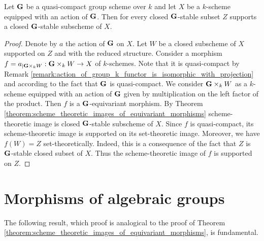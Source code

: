 \begin{corollary}\label{corollary:every_closed_stable_subset_supports_closed_stable_subscheme}
Let $\mathbf{G}$ be a quasi-compact group scheme over $k$ and let $X$ be a $k$-scheme equipped with an action of $\mathbf{G}$. Then for every closed $\mathbf{G}$-stable subset $Z$ supports a closed $\mathbf{G}$-stable subscheme of $X$.
\end{corollary}
\begin{proof}
Denote by $a$ the action of $\mathbf{G}$ on $X$. Let $W$ be a closed subscheme of $X$ supported on $Z$ and with the reduced structure. Consider a morphism $f = a_{\mid \mathbf{G}\times_k W}:\mathbf{G}\times_k W\rightarrow X$ of $k$-schemes. Note that it is quasi-compact by Remark \ref{remark:action_of_group_k_functor_is_isomorphic_with_projection} and according to the fact that $\mathbf{G}$ is quasi-compact. We consider $\mathbf{G}\times_k W$ as a $k$-scheme equipped with an action of $\mathbf{G}$ given by multiplication on the left factor of the product. Then $f$ is a $\mathbf{G}$-equivariant morphism. By Theorem \ref{theorem:scheme_theoretic_images_of_equivariant_morphisms} scheme-theoretic image is closed $\mathbf{G}$-stable subscheme of $X$. Since $f$ is quasi-compact, its scheme-theoretic image is supported on its set-theoretic image. Moreover, we have $f(W) = Z$ set-theoretically. Indeed, this is a consequence of the fact that $Z$ is $\mathbf{G}$-stable closed subset of $X$. Thus the scheme-theoretic image of $f$ is supported on $Z$.
\end{proof}

\section{Morphisms of algebraic groups}
\noindent
The following result, which proof is analogical to the proof of Theorem \ref{theorem:scheme_theoretic_images_of_equivariant_morphisms}, is fundamental.

